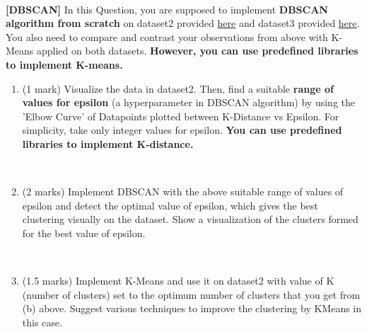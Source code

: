 \documentclass[addpoints,12pt,solution]{exam}
\begin{document}
\begin{questions}
\begin{enumerate}[label=(\alph*)]
\begin{solution}\\
    
\end{solution}
\end{enumerate}


\question \textbf{[DBSCAN]} 
In this Question, you are supposed to implement \textbf{DBSCAN algorithm from scratch} on dataset2 provided \href{https://drive.google.com/drive/folders/16a2lk1oi_c6phXj4jKe4fanW6YjQI-TX?usp=share_link}{here} and dataset3 provided \href{https://drive.google.com/drive/folders/1mA9pPvudet3weM6rrx3roWrbKftfqHlt?usp=share_link}{here}. You also need to compare and contrast your observations from above with K-Means applied on both datasets. \textbf{However, you can use predefined libraries to implement K-means.}


\begin{enumerate}[label=(\alph*)]
\item (1 mark) 
Visualize the data in dataset2. Then, find a suitable \textbf{range of values for epsilon} (a hyperparameter in DBSCAN algorithm) by using  the 'Elbow Curve' of Datapoints plotted between  K-Distance vs Epsilon. For simplicity, take only integer values for epsilon. \textbf{You can use predefined libraries to implement K-distance.}


\begin{solution} \\

\end{solution}

\item (2 marks) Implement DBSCAN with the above suitable range of values of epsilon and detect the optimal value of epsilon, which gives the best clustering visually on the dataset. Show a visualization of the clusters formed for the best value of epsilon.

\begin{solution} \\

\end{solution}


\item (1.5 marks) Implement K-Means and use it on dataset2 with value of K (number of clusters) set to the optimum number of clusters that you get from (b) above. Suggest various techniques to improve the clustering by KMeans in this case. 
\begin{solution} \\


\end{solution}
\end{enumerate}
\end{questions}
\end{document}
